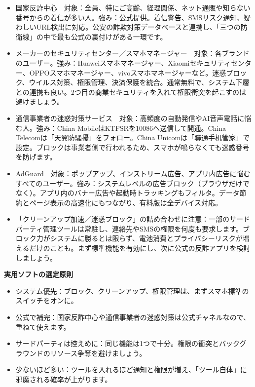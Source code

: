 
\begin{itemize}
  \item 国家反詐中心　対象：全員、特にご高齢、経理関係、ネット通販や知らない番号からの着信が多い人。強み：公式提供。着信警告、SMSリスク通知、疑わしいURL検出に対応。公安の詐欺対策データベースと連携し、「三つの防衛線」の中で最も公式の裏付けがある一環です。
  \item メーカーのセキュリティセンター／スマホマネージャー　対象：各ブランドのユーザー。強み：Huaweiスマホマネージャー、Xiaomiセキュリティセンター、OPPOスマホマネージャー、vivoスマホマネージャーなど。迷惑ブロック、ウイルス対策、権限管理、決済保護を統合。通常無料で、システム下層との連携も良い。2つ目の商業セキュリティを入れて権限衝突を起こすのは避けましょう。
  \item 通信事業者の迷惑対策サービス　対象：高頻度の自動発信やAI音声電話に悩む人。強み：China MobileはKTFSRを10086へ送信して開通。China Telecomは「天翼防騷擾」をフォロー。China Unicomは「聯通手机管家」で設定。ブロックは事業者側で行われるため、スマホが鳴らなくても迷惑番号を防げます。
  \item AdGuard　対象：ポップアップ、インストリーム広告、アプリ内広告に悩むすべてのユーザー。強み：システムレベルの広告ブロック（ブラウザだけでなく）。アプリ内のバナー広告や起動時トラッキングもフィルタ。データ節約とページ表示の高速化にもつながり、有料版は全デバイス対応。
  \item 「クリーンアップ加速／迷惑ブロック」の詰め合わせに注意：一部のサードパーティ管理ツールは常駐し、連絡先やSMSの権限を何度も要求します。ブロック力がシステムに勝るとは限らず、電池消費とプライバシーリスクが増えるだけのことも。まず標準機能を有効にし、次に公式の反詐アプリを検討しましょう。
\end{itemize}

\textbf{実用ソフトの選定原則}\par

\begin{itemize}
  \item システム優先：ブロック、クリーンアップ、権限管理は、まずスマホ標準のスイッチをオンに。
  \item 公式で補完：国家反詐中心や通信事業者の迷惑対策は公式チャネルなので、重ねて使えます。
  \item サードパーティは控えめに：同じ機能は1つで十分。権限の衝突とバックグラウンドのリソース争奪を避けましょう。
  \item 少ないほど多い：ツールを入れるほど通知と権限が増え、「ツール自体」に邪魔される確率が上がります。
\end{itemize}

